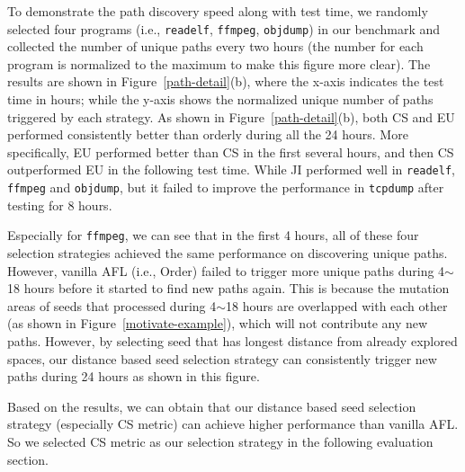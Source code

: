To demonstrate the path discovery speed along with test time, we randomly selected four programs (i.e., \texttt{readelf}, \texttt{ffmpeg}, \texttt{objdump}) in our benchmark and collected the number of unique paths every two hours (the number for each program is normalized to the maximum to make this figure more clear).
 The results are shown in Figure~\ref{path-detail}(b), where the x-axis indicates the test time in hours; while the y-axis shows the normalized unique number of paths triggered by each strategy.
As shown in Figure~\ref{path-detail}(b), both CS and EU performed consistently better than orderly during all the 24 hours.
 More specifically, EU performed better than CS in the first several hours, and then CS outperformed EU in the following test time.
 While JI performed well in \texttt{readelf}, \texttt{ffmpeg} and \texttt{objdump}, but it failed to improve the performance in \texttt{tcpdump} after testing for 8 hours.
 
 Especially for \texttt{ffmpeg}, we can see that in the first 4 hours, all of these four selection strategies achieved the same performance on discovering unique paths.
  However, vanilla AFL (i.e., Order) failed to trigger more unique paths during 4$\sim$18 hours before it started to find new paths again.
  This is because the mutation areas of seeds that processed during 4$\sim$18 hours are overlapped with each other (as shown in Figure~\ref{motivate-example}), which will not contribute any new paths.
  However, by selecting seed that has longest distance from already explored spaces, our distance based seed selection strategy can consistently trigger new paths during 24 hours as shown in this figure.

Based on the results, we can obtain that our distance based seed selection strategy (especially CS metric) can achieve higher performance than vanilla AFL.
 So we selected CS metric as our selection strategy in the following evaluation section.


